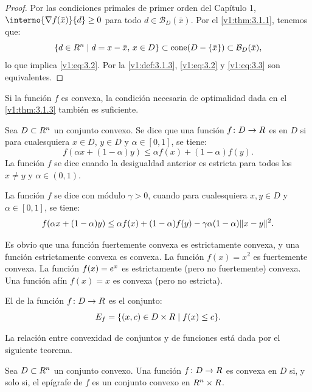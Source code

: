 \begin{proof}
 Por las condiciones primales de primer orden del Capítulo 1, $\interno{\nabla f(\bar{x})}{d} \geq 0$ para todo $d \in \mathcal{B}_D(\bar{x})$. Por el \cref{v1:thm:3.1.1}, tenemos que:
 \[
 \{d \in R^n \mid d = x - \bar{x}, \, x \in D\} \subset \text{cone}(D - \{\bar{x}\}) \subset \mathcal{B}_D(\bar{x}),
 \]
 lo que implica \eqref{v1:eq:3.2}. Por la \cref{v1:def:3.1.3}, \eqref{v1:eq:3.2} y \eqref{v1:eq:3.3} son equivalentes.
\end{proof}

Si la función $f$ es convexa, la condición necesaria de optimalidad dada en el \cref{v1:thm:3.1.3} también es suficiente.

\begin{definition}\label{v1:def:3.1.4}
 Sea $D \subset R^n$ un conjunto convexo. Se dice que una función $f \colon D \to R$ es  en $D$ si para cualesquiera $x \in D$, $y \in D$ y $\alpha \in [0, 1]$, se tiene:
 \[
 f(\alpha x + (1 - \alpha)y) \leq \alpha f(x) + (1 - \alpha)f(y).
 \]
 La función $f$ se dice  cuando la desigualdad anterior es estricta para todos los $x \neq y$ y $\alpha \in (0, 1)$.
 
 La función $f$ se dice  con módulo $\gamma > 0$, cuando para cualesquiera $x, y \in D$ y $\alpha \in [0, 1]$, se tiene:
 \[
 f(\alpha x + (1 - \alpha)y) \leq \alpha f(x) + (1 - \alpha)f(y) - \gamma \alpha (1 - \alpha) \lVert x - y\rVert^2.
 \]
\end{definition}

Es obvio que una función fuertemente convexa es estrictamente convexa, y una función estrictamente convexa es convexa. La función $f(x) = x^2$ es fuertemente convexa. La función $f(x) = e^x$ es estrictamente (pero no fuertemente) convexa. Una función afín $f(x) = x$ es convexa (pero no estricta).

\begin{definition}[Epígrafe]\label{v1:def:3.1.5}
 El  de la función $f \colon D \to R$ es el conjunto:
 \[
 E_f = \{(x, c) \in D \times R \mid f(x) \leq c\}.
 \]
\end{definition}

La relación entre convexidad de conjuntos y de funciones está dada por el siguiente teorema.

\begin{theorem}\label{v1:thm:3.1.4}
 Sea $D \subset R^n$ un conjunto convexo. Una función $f \colon D \to R$ es convexa en $D$ si, y solo si, el epígrafe de $f$ es un conjunto convexo en $R^n \times R$.
\end{theorem}

